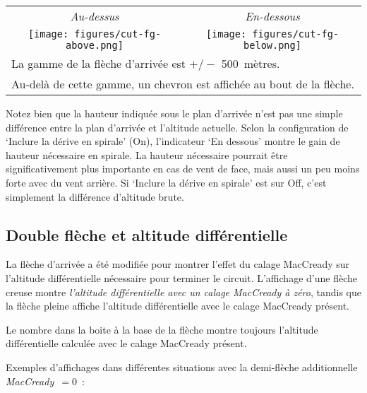 \begin{center}
\begin{tabular}{c c}
\emph{Au-dessus} & \emph{En-dessous} \\
\texttt{[image: figures/cut-fg-above.png]} &
\texttt{[image: figures/cut-fg-below.png]} \\
\multicolumn{2}{l}{La gamme de la flèche d'arrivée est $+/-$ 500~mètres.} \\
\multicolumn{2}{l}{Au-delà de cette gamme, un chevron est affichée au bout de la flèche.}
\end{tabular}
\end{center}
\tip{}
Notez bien que la hauteur indiquée sous le plan d'arrivée n'est pas une simple différence entre la plan d'arrivée et l'altitude actuelle.
Selon la configuration de `Inclure la dérive en spirale' (On), l'indicateur `En dessous' montre le gain de hauteur nécessaire en spirale. 
La hauteur nécessaire pourrait être significativement plus importante en cas de vent de face, mais aussi un peu moins forte avec du vent arrière.
Si `Inclure la dérive en spirale' est sur Off, c'est simplement la différence d'altitude brute.



\subsection*{Double flèche et altitude différentielle}

La flèche d'arrivée a été modifiée pour montrer l'effet du calage MacCready sur l'altitude différentielle nécessaire pour terminer le circuit.
L'affichage d'une flèche creuse montre \emph{l'altitude différentielle avec un calage MacCready à zéro}, tandis que la flèche pleine affiche l'altitude différentielle avec le calage MacCready présent.

Le nombre dans la boite à la base de la flèche montre toujours l'altitude différentielle calculée avec le calage MacCready présent.

Exemples d'affichages dans différentes situations avec la demi-flèche additionnelle \emph{MacCready~$=0$}~:

